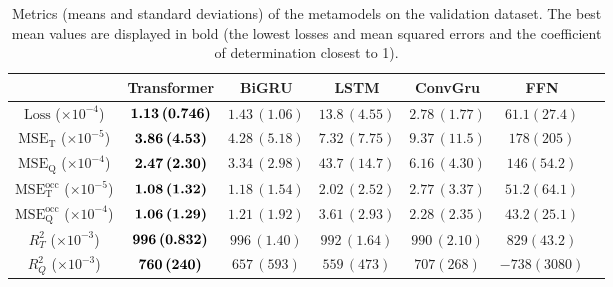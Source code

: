 \documentclass[12pt]{article}
\newcommand{\eqsp}{\,}
\begin{document}
\begin{table}
    \caption{Metrics (means and standard deviations) of the metamodels on the validation dataset. The best mean values are displayed in bold (the lowest losses and mean squared errors and the coefficient of determination closest to 1).}
    \label{table:train}
    \centering
    \begin{tabular}{*7c}\toprule
                                                       & Transformer                  & BiGRU              & LSTM               & ConvGru            & FFN           \\
        \toprule
        $\mathrm{Loss}$ \;\;\;\;\;($\times10^{-4}$)    & $\textbf{1.13\eqsp (0.746)}$ & $1.43\eqsp (1.06)$ & $13.8\eqsp (4.55)$ & $2.78\eqsp (1.77)$ & $61.1 (27.4)$ \\
        $\mathrm{MSE_T}$ \;\;($\times10^{-5}$)         & $\textbf{3.86\eqsp (4.53)}$  & $4.28\eqsp (5.18)$ & $7.32\eqsp (7.75)$ & $9.37\eqsp (11.5)$ & $178 (205)$   \\
        $\mathrm{MSE_Q}$ \;\;($\times10^{-4}$)         & $\textbf{2.47\eqsp (2.30)}$  & $3.34\eqsp (2.98)$ & $43.7\eqsp (14.7)$ & $6.16\eqsp (4.30)$ & $146 (54.2)$  \\
        $\mathrm{MSE_T^{occ}}$ ($\times10^{-5}$)       & $\textbf{1.08\eqsp (1.32)}$  & $1.18\eqsp (1.54)$ & $2.02\eqsp (2.52)$ & $2.77\eqsp (3.37)$ & $51.2 (64.1)$ \\
        $\mathrm{MSE_Q^{occ}}$  ($\times10^{-4}$)      & $\textbf{1.06\eqsp (1.29)}$  & $1.21\eqsp (1.92)$ & $3.61\eqsp (2.93)$ & $2.28\eqsp (2.35)$ & $43.2 (25.1)$ \\
        \emph{$R^2_T$} \;\;\;\;\;\;\;($\times10^{-3}$) & $\textbf{996\eqsp (0.832)}$  & $996\eqsp (1.40)$  & $992\eqsp (1.64)$  & $990\eqsp (2.10)$  & $829 (43.2)$  \\
        \emph{$R^2_Q$} \;\;\;\;\;\;\;($\times10^{-3}$) & $\textbf{760\eqsp (240)}$    & $657\eqsp (593)$   & $559\eqsp (473)$   & $707 (268)$        & $-738 (3080)$ \\
        \bottomrule
    \end{tabular}
\end{table}
\end{document}
